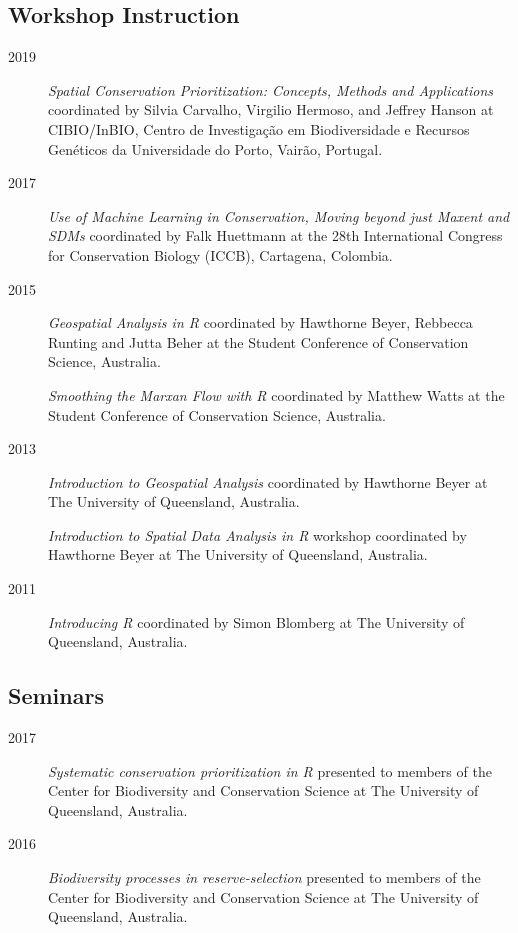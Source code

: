 \documentclass[12pt,a4paper]{article}
\begin{document}
\subsection*{Workshop Instruction}
\begin{description}

\item[2019] \textit{Spatial Conservation Prioritization: Concepts, Methods and Applications} coordinated by Silvia Carvalho, Virgilio Hermoso, and Jeffrey Hanson at CIBIO/InBIO, Centro de Investigação em Biodiversidade e Recursos Genéticos da Universidade do Porto, Vairão, Portugal.

\item[2017] \textit{Use of Machine Learning in Conservation, Moving beyond just Maxent and SDMs} coordinated by Falk Huettmann at the 28th International Congress for Conservation Biology (ICCB), Cartagena, Colombia.

\item[2015] \textit{Geospatial Analysis in R} coordinated by Hawthorne Beyer, Rebbecca Runting and Jutta Beher at the Student Conference of Conservation Science, Australia.

\item[] \textit{Smoothing the Marxan Flow with R} coordinated by Matthew Watts at the Student Conference of Conservation Science, Australia.

\item[2013] \textit{Introduction to Geospatial Analysis} coordinated by Hawthorne Beyer at The University of Queensland, Australia.

\item[] \textit{Introduction to Spatial Data Analysis in R} workshop coordinated by Hawthorne Beyer at The University of Queensland, Australia.

\item[2011] \textit{Introducing R} coordinated by Simon Blomberg at The University of Queensland, Australia.

\end{description}

\subsection*{Seminars}
\begin{description}

\item[2017] \textit{Systematic conservation prioritization in R} presented to members of the Center for Biodiversity and Conservation Science at The University of Queensland, Australia.

\item[2016] \textit{Biodiversity processes in reserve-selection} presented to members of the Center for Biodiversity and Conservation Science at The University of Queensland, Australia.

\end{description}
\end{document}
